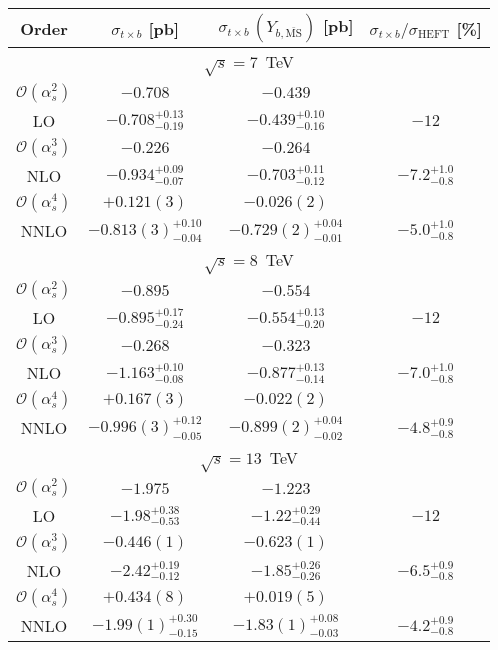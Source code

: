 \begin{table}
  \centering
  \begin{tabular}{cccc}
  Order  & $\sigma_{t\times b}$ [pb] & $\sigma_{t\times b} \,(Y_{b,\overline{\text{MS}}})$ [pb] &  $\sigma_{t\times b}/\sigma_\text{HEFT}$ [\%]  \\
  \hline
  \hline
  \multicolumn{4}{c}{$\sqrt{s}=7$~TeV}\\
  \hline
  $\mathcal{O}(\alpha_s^2)$  & $-0.708$ & $-0.439$ & \\
  LO  & $-0.708^{+0.13}_{-0.19}$ & $-0.439^{+0.10}_{-0.16}$ & $-12$ \\
  \hline
  $\mathcal{O}(\alpha_s^3)$ & $-0.226$ & $-0.264$ & \\
  NLO &  $-0.934^{+0.09}_{-0.07}$ & $-0.703^{+0.11}_{-0.12}$ & $-7.2^{+1.0}_{-0.8}$ \\
  \hline
  $\mathcal{O}(\alpha_s^4)$  & $+0.121(3)$ & $-0.026(2)$ & \\
  NNLO &  $-0.813(3)^{+0.10}_{-0.04}$ & $-0.729(2)^{+0.04}_{-0.01}$ & $-5.0^{+1.0}_{-0.8}$ \\
  \hline
  \hline
  \multicolumn{4}{c}{$\sqrt{s}=8$~TeV}\\
  \hline
  $\mathcal{O}(\alpha_s^2)$ &  $-0.895$ & $-0.554$ & \\
  LO  & $-0.895^{+0.17}_{-0.24}$ & $-0.554^{+0.13}_{-0.20}$ & $-12$ \\
  \hline
  $\mathcal{O}(\alpha_s^3)$ & $-0.268$ & $-0.323$ & \\
  NLO  & $-1.163^{+0.10}_{-0.08}$ & $-0.877^{+0.13}_{-0.14}$ & $-7.0^{+1.0}_{-0.8}$ \\
  \hline
  $\mathcal{O}(\alpha_s^4)$  & $+0.167(3)$ & $-0.022(2)$ & \\
  NNLO  & $-0.996(3)^{+0.12}_{-0.05}$ & $-0.899(2)^{+0.04}_{-0.02}$ & $-4.8^{+0.9}_{-0.8}$ \\
  \hline
  \hline
  \multicolumn{4}{c}{$\sqrt{s}=13$~TeV}\\
  \hline
  $\mathcal{O}(\alpha_s^2)$ & $-1.975$ & $-1.223$ & \\
  LO & $-1.98^{+0.38}_{-0.53}$ & $-1.22^{+0.29}_{-0.44}$ & $-12$ \\
  \hline
  $\mathcal{O}(\alpha_s^3)$ & $-0.446(1)$ & $-0.623(1)$ & \\
  NLO & $-2.42^{+0.19}_{-0.12}$ & $-1.85^{+0.26}_{-0.26}$ & $-6.5^{+0.9}_{-0.8}$ \\
  \hline
  $\mathcal{O}(\alpha_s^4)$ & $+0.434(8)$ & $+0.019(5)$ & \\
  NNLO & $-1.99(1)^{+0.30}_{-0.15}$ & $-1.83(1)^{+0.08}_{-0.03}$ & $-4.2^{+0.9}_{-0.8}$ \\

\end{tabular}
\end{table}
